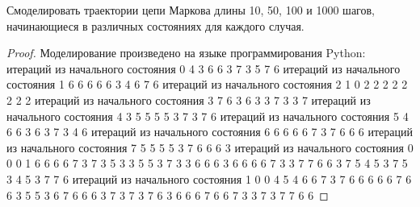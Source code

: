 \begin{problem}
	Смоделировать траектории цепи Маркова длины 10, 50, 100 и 1000 шагов, начинающиеся в различных состояниях для каждого случая.
\end{problem}

\begin{proof}
	Моделирование произведено на языке программирования Python:
	 итераций из начального состояния 0
	 4 3 6 6 3 7 3 5 7 6 
	\newline
	 итераций из начального состояния 1
	 6 6 6 6 6 3 4 6 7 6 
	\newline
	 итераций из начального состояния 2
	 1 0 2 2 2 2 2 2 2 2 
	\newline
	 итераций из начального состояния 3
	 7 6 3 6 3 3 7 3 3 7 
	\newline
	 итераций из начального состояния 4
	 3 5 5 5 5 3 7 3 7 6 
	\newline
	 итераций из начального состояния 5
	 4 6 6 3 6 3 7 3 4 6 
	\newline
	 итераций из начального состояния 6
	 6 6 6 6 7 3 7 6 6 6 
	\newline
	 итераций из начального состояния 7
	 5 5 5 5 3 7 6 6 6 3 
	\newline
	 итераций из начального состояния 0
	 0 0 1 6 6 6 6 7 3 7 3 5 3 3 5 5 3 7 3 3 6 6 6 3 6 6 6 6 7 3 3 7 7 6 6 3 7 5 4 5 3 7 5 3 4 5 3 7 7 6 
	\newline
	 итераций из начального состояния 1
	 0 0 4 5 4 6 6 7 3 7 6 6 6 6 6 7 6 6 3 5 5 3 6 7 6 6 6 3 7 3 7 3 7 6 3 6 6 6 7 6 6 7 3 3 7 3 7 7 6 6 

\end{proof}
